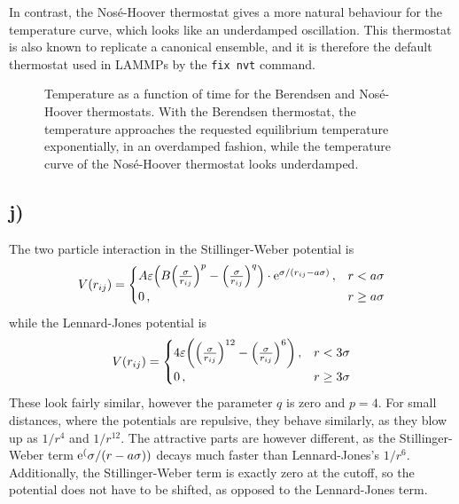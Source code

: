 \documentclass[11pt,british,a4paper]{report}
\let\oldexp=\exp
\renewcommand{\exp}[1]{\mathrm{e}^{#1}}
\begin{document}
In contrast, the Nosé-Hoover thermostat gives a more natural behaviour for the temperature curve, which looks like an underdamped oscillation.
This thermostat is also known to replicate a canonical ensemble\cite{evans_nosehoover_1985}, and it is therefore the default thermostat used in LAMMPs by the \texttt{fix nvt} command.
\begin{figure}[htbp]
    \centering
    \caption{Temperature as a function of time for the Berendsen and Nosé-Hoover thermostats.
    With the Berendsen thermostat, the temperature approaches the requested equilibrium temperature exponentially, in an overdamped fashion, while the temperature curve of the Nosé-Hoover thermostat looks underdamped.}%
    \label{fig:thermostats}
\end{figure}

\subsection*{j)}
The two particle interaction in the Stillinger-Weber potential is
\[
    V(r_{ij}) = \begin{cases}A\varepsilon\qty(B\qty(\frac{\sigma}{r_{ij}})^p - \qty(\frac{\sigma}{r_{ij}})^q)\cdot\exp{\sigma/\qty(r_{ij}-a\sigma)}\,, & r < a\sigma\\ 0\,, & r\geq a\sigma \end{cases}
\]
while the Lennard-Jones potential is
\[
    V(r_{ij}) = \begin{cases}4\varepsilon \qty({\qty(\frac{\sigma}{r_{ij}})}^{12} - {\qty(\frac{\sigma}{r_{ij}})}^6)\,, & r < 3\sigma\\ 0\,, & r\geq3\sigma\end{cases}
\]
These look fairly similar, however the parameter \(q\) is zero\cite{stillinger_computer_1985} and \(p=4\). For small distances, where the potentials are repulsive, they behave similarly, as they blow up as \(1/r^4\) and \(1/r^{12}\). The attractive parts are however different, as the Stillinger-Weber term \(\oldexp(\sigma/\qty(r-a\sigma))\) decays much faster than Lennard-Jones's \(1/r^6\). Additionally, the Stillinger-Weber term is exactly zero at the cutoff, so the potential does not have to be shifted, as opposed to the Lennard-Jones term.
\end{document}
